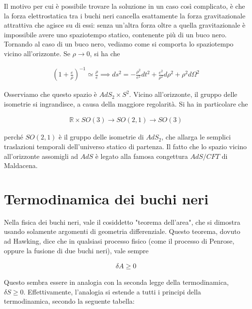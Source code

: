 \documentclass{report}
\begin{document}
Il motivo per cui è possibile trovare la soluzione in un caso così complicato, è che la forza elettrostatica tra i buchi neri cancella esattamente la forza gravitazionale attrattiva che agisce su di essi: senza un'altra forza oltre a quella gravitazionale è impossibile avere uno spaziotempo statico, contenente più di un buco nero. \\

Tornando al caso di un buco nero, vediamo come si comporta lo spaziotempo vicino all'orizzonte. Se \(\rho \rightarrow 0\), si ha che 

\begin{align}
    \left(1 + \frac{e}{\rho} \right)^{-1} \simeq \frac{\rho}{e} \implies ds^2 = -\frac{\rho^2}{e^2}dt^2 + \frac{e^2}{\rho^2}d\rho^2 +\rho^2d\Omega^2
\end{align}

Osserviamo che questo spazio è \(AdS_2 \times S^2\). Vicino all'orizzonte, il gruppo delle isometrie si ingrandisce, a causa della maggiore regolarità. Si ha in particolare che 

\begin{align}
    \mathbb{R}\times SO(3) \rightarrow SO(2, 1) \rightarrow SO(3)
\end{align}

perché \(SO(2,1)\) è il gruppo delle isometrie di \(AdS_2\), che allarga le semplici traslazioni temporali dell'universo statico di partenza. Il fatto che lo spazio vicino all'orizzonte assomigli ad \(AdS\) è legato alla famosa congettura \(AdS/CFT\) di Maldacena. 

\section{Termodinamica dei buchi neri}

Nella fisica dei buchi neri, vale il cosiddetto "teorema dell'area", che si dimostra usando solamente argomenti di geometria differenziale. Questo teorema, dovuto ad Hawking, dice che in qualsiasi processo fisico (come il processo di Penrose, oppure la fusione di due buchi neri), vale sempre 

\begin{align}
    \delta A \geq 0 
\end{align}

Questo sembra essere in analogia con la seconda legge della termodinamica, \(\delta S \geq 0\). Effettivamente, l'analogia si estende a tutti i principi della termodinamica, secondo la seguente tabella: 
\end{document}
